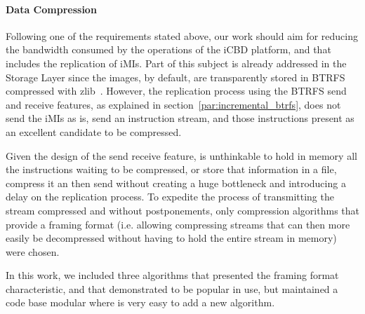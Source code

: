 \paragraph{Data Compression}
\label{par:impl_data_compression}

Following one of the requirements stated above, our work should aim for reducing the bandwidth consumed by the operations of the iCBD platform, and that includes the replication of iMIs. Part of this subject is already addressed in the Storage Layer since the images, by default, are transparently stored in BTRFS compressed with zlib~\cite{btrfs_compression}. However, the replication process using the BTRFS send and receive features, as explained in section~\ref{par:incremental_btrfs}, does not send the iMIs as is, send an instruction stream, and those instructions present as an excellent candidate to be compressed. 

Given the design of the send \/ receive feature, is unthinkable to hold in memory all the instructions waiting to be compressed, or store that information in a file, compress it an then send without creating a huge bottleneck and introducing a delay on the replication process. To expedite the process of transmitting the stream compressed and without postponements, only compression algorithms that provide a framing format (i.e. allowing compressing streams that can then more easily be decompressed without having
to hold the entire stream in memory) were chosen.

In this work, we included three algorithms that presented the framing format characteristic, and that demonstrated to be popular in use, but maintained a code base modular where is very easy to add a new algorithm.

